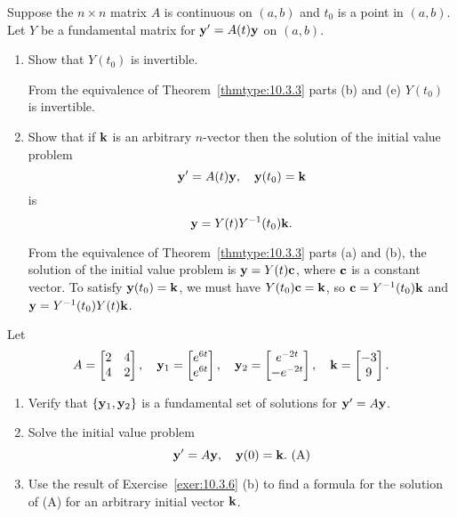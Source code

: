 \documentclass{ximera}
\begin{document}
\begin{problem}\label{exer:10.3.6}
Suppose the $n\times n$ matrix $A$ is continuous on $(a,b)$
and $t_0$ is a point in  $(a,b)$. Let $Y$  be a fundamental matrix for
${\bf y}'=A(t){\bf y}$ on  $(a,b)$.
\begin{enumerate}
\item %
Show that $Y(t_0)$  is invertible.

\begin{solution}
    From  the equivalence of Theorem~\ref{thmtype:10.3.3} parts (b) and (e)
$Y(t_0)$ is invertible.
\end{solution}

\item %
Show that if ${\bf k}$ is an arbitrary $n$-vector then the solution
of the initial value problem
$$
{\bf y}'=A(t){\bf y},\quad {\bf y}(t_0)={\bf k}
$$
is
$$
{\bf y}=Y(t)Y^{-1}(t_0){\bf k}.
$$

\begin{solution}
    From  the equivalence of Theorem~\ref{thmtype:10.3.3} parts (a) and (b),
the solution of the initial value problem is ${\bf y}=Y(t){\bf
c}$, where ${\bf c}$ is a constant vector. To satisfy ${\bf
y}(t_0)={\bf k}$, we must have
$Y(t_0){\bf c}={\bf k}$, so ${\bf c}=Y^{-1}(t_0){\bf k}$
and ${\bf y}=Y^{-1}(t_0)Y(t){\bf k}$.
\end{solution}
\end{enumerate}
\end{problem}

\begin{problem}\label{exer:10.3.7}
Let
$$
 A=\begin{bmatrix}2 & 4\\4 & 2\end{bmatrix}, \quad {\bf y}_1=\begin{bmatrix} e^{6t} \\
e^{6t}
\end{bmatrix}, \quad {\bf y}_2=\begin{bmatrix}
e^{-2t} \\
-e^{-2t}\end{bmatrix}, \quad {\bf k}=\begin{bmatrix}-3
\\ 9\end{bmatrix}.
$$
\begin{enumerate}
\item %
 Verify that $\{{\bf y}_1,{\bf y}_2\}$
is a fundamental set of solutions for
${\bf y}'=A{\bf y}$.

\item %
Solve  the initial value problem
$$
{\bf y}'=A{\bf y},\quad   {\bf y}(0)={\bf k}.
\text{ (A)}
$$

\item %
Use the result of Exercise~\ref{exer:10.3.6} (b) to find a formula for
the solution of (A) for an arbitrary initial vector ${\bf
k}$.
\end{enumerate}
\end{problem}
\end{document}
